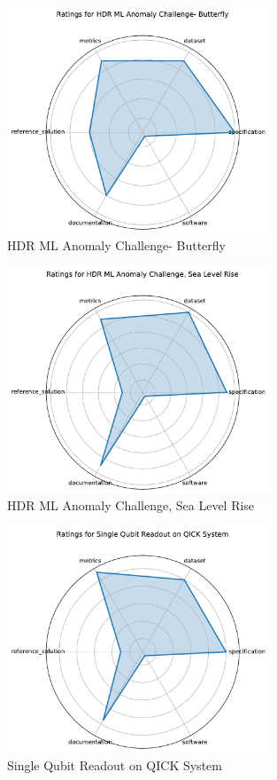 \documentclass{article}
\begin{document}
\begin{figure}[h!]
  \centering
  \includegraphics[width=0.7\textwidth]{HDR ML Anomaly Challenge- Butterfly_radar.pdf}
  \caption{HDR ML Anomaly Challenge- Butterfly}
\end{figure}

\begin{figure}[h!]
  \centering
  \includegraphics[width=0.7\textwidth]{HDR ML Anomaly Challenge_ Sea Level Rise_radar.pdf}
  \caption{HDR ML Anomaly Challenge, Sea Level Rise}
\end{figure}

\begin{figure}[h!]
  \centering
  \includegraphics[width=0.7\textwidth]{Single Qubit Readout on QICK System_radar.pdf}
  \caption{Single Qubit Readout on QICK System}
\end{figure}
\end{document}
